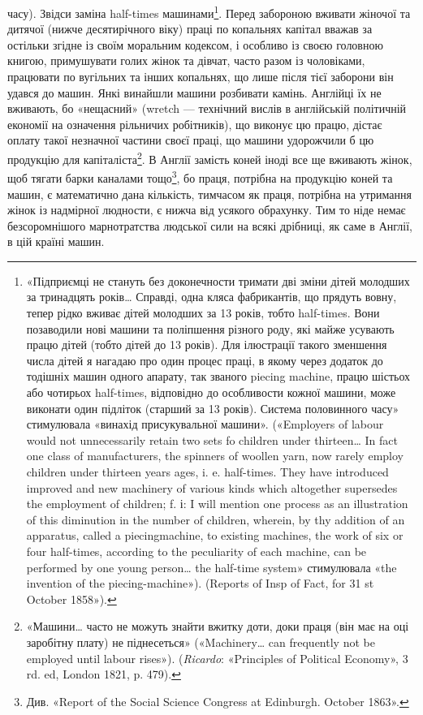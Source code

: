 часу). Звідси заміна half-times машинами\footnote{
«Підприємці не стануть без доконечности тримати дві зміни дітей
молодших за тринадцять років\dots{} Справді, одна кляса фабрикантів, що
прядуть вовну, тепер рідко вживає дітей молодших за 13 років, тобто
half-times. Вони позаводили нові машини та поліпшення різного роду,
які майже усувають працю дітей (тобто дітей до 13 років). Для ілюстрації
такого зменшення числа дітей я нагадаю про один процес праці, в якому
через додаток до тодішніх машин одного апарату, так званого piecing
machine, працю шістьох або чотирьох half-times, відповідно до особливости
кожної машини, може виконати один підліток (старший за
13 років). Система половинного часу» стимулювала «винахід присукувальної
машини». («Employers of labour would not unnecessarily retain two sets
fo children under thirteen\dots{} In fact one class of manufacturers, the spinners
of woollen yarn, now rarely employ children under thirteen years ages, i. e.
half-times. They have introduced improved and new machinery of various
kinds which altogether supersedes the employment of children; f. і: I will
mention one process as an illustration of this diminution in the number
of children, wherein, by thy addition of an apparatus, called a piecingmachine,
to existing machines, the work of six or four half-times, according
to the peculiarity of each machine, can be performed by one young
person\dots{} the half-time system» стимулювала «the invention of the
piecing-machine»). (Reports of Insp of Fact, for 31 st October 1858»).
}. Перед забороною
вживати жіночої та дитячої (нижче десятирічного віку) праці по
копальнях капітал вважав за остільки згідне із своїм моральним
кодексом, і особливо із своєю головною книгою, примушувати
голих жінок та дівчат, часто разом із чоловіками, працювати по
вугільних та інших копальнях, що лише після тієї заборони він
удався до машин. Янкі винайшли машини розбивати камінь.
Англійці їх не вживають, бо «нещасний» (wretch — технічний
вислів в англійській політичній економії на означення рільничих
робітників), що виконує цю працю, дістає оплату такої
незначної частини своєї праці, що машини удорожчили б цю
продукцію для капіталіста\footnote{
«Машини\dots{} часто не можуть знайти вжитку доти, доки праця (він
має на оці заробітну плату) не піднесеться» («Machinery\dots{} can frequently
not be employed until labour rises»). (\emph{Ricardo}: «Principles of
Political Economy», 3 rd. ed, London 1821, p. 479).
}. В Англії замість коней іноді все
ще вживають жінок, щоб тягати барки каналами тощо\footnote{
Див. «Report of the Social Science Congress at Edinburgh. October
1863».
}, бо
праця, потрібна на продукцію коней та машин, є математично
дана кількість, тимчасом як праця, потрібна на утримання жінок
із надмірної людности, є нижча від усякого обрахунку. Тим то
ніде немає безсоромнішого марнотратства людської сили на всякі
дрібниці, як саме в Англії, в цій країні машин.

